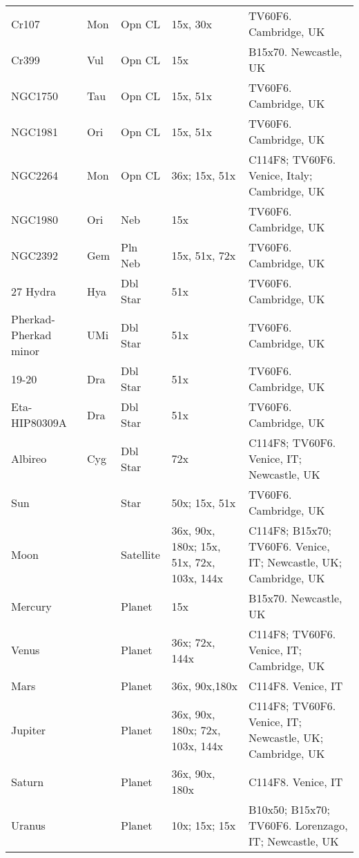 \begin{longtable}{ p{0.8in}  p{0.3in}  p{0.5in}  p{0.9in}  p{5.8in} }
Cr107 & Mon & Opn CL & 15x, 30x & TV60F6. Cambridge, UK \\ 
Cr399 & Vul & Opn CL & 15x & B15x70. Newcastle, UK \\ 
NGC1750 & Tau & Opn CL & 15x, 51x & TV60F6. Cambridge, UK \\ 
NGC1981 & Ori & Opn CL & 15x, 51x & TV60F6. Cambridge, UK \\ 
NGC2264 & Mon & Opn CL & 36x; 15x, 51x & C114F8; TV60F6. Venice, Italy; Cambridge, UK \\ 
NGC1980 & Ori & Neb & 15x & TV60F6. Cambridge, UK \\ 
NGC2392 & Gem & Pln Neb & 15x, 51x, 72x & TV60F6. Cambridge, UK \\ 
27 Hydra & Hya & Dbl Star & 51x & TV60F6. Cambridge, UK \\ 
Pherkad-Pherkad minor & UMi & Dbl Star & 51x & TV60F6. Cambridge, UK \\ 
19-20 & Dra & Dbl Star & 51x & TV60F6. Cambridge, UK \\ 
Eta-HIP80309A & Dra & Dbl Star & 51x & TV60F6. Cambridge, UK \\ 
Albireo & Cyg & Dbl Star & 72x & C114F8; TV60F6. Venice, IT; Newcastle, UK \\ 
Sun &  & Star & 50x; 15x, 51x & TV60F6. Cambridge, UK \\ 
Moon &  & Satellite & 36x, 90x, 180x; 15x, 51x, 72x, 103x, 144x & C114F8; B15x70; TV60F6. Venice, IT; Newcastle, UK; Cambridge, UK \\ 
Mercury &  & Planet & 15x & B15x70. Newcastle, UK \\ 
Venus &  & Planet & 36x; 72x, 144x & C114F8; TV60F6. Venice, IT; Cambridge, UK \\ 
Mars &  & Planet & 36x, 90x,180x & C114F8. Venice, IT \\ 
Jupiter &  & Planet & 36x, 90x, 180x; 72x, 103x, 144x & C114F8; TV60F6. Venice, IT; Newcastle, UK; Cambridge, UK \\ 
Saturn &  & Planet & 36x, 90x, 180x & C114F8. Venice, IT \\ 
Uranus &  & Planet & 10x; 15x; 15x & B10x50; B15x70; TV60F6. Lorenzago, IT; Newcastle, UK \\ 
\hline 
\end{longtable} 
